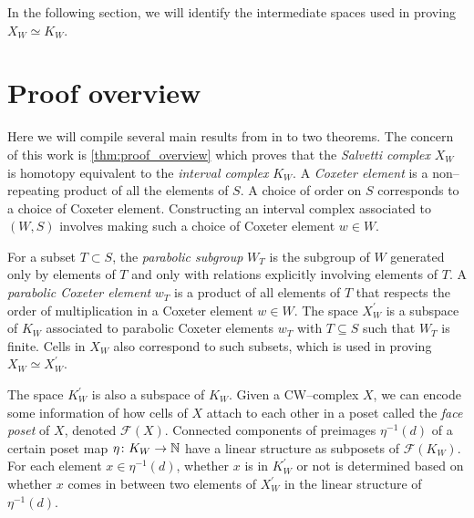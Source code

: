 \documentclass[class=guthesis, crop=false]{standalone}
\begin{document}
In the following section, we will identify the intermediate spaces used in proving $X_W \simeq K_W$.

\section{Proof overview}

Here we will compile several main results from \cite{paolini_salvetti_kpi1_2021} in to two theorems. The concern of this work is \cref{thm:proof_overview} which proves that the \emph{Salvetti complex} $X_W$ is homotopy equivalent to the \emph{interval complex} $K_W$. A \emph{Coxeter element} is a non--repeating product of all the elements of $S$. A choice of order on $S$ corresponds to a choice of Coxeter element. Constructing an interval complex associated to $(W,S)$ involves making such a choice of Coxeter element $w \in W$. 

For a subset $T \subset S$, the \emph{parabolic subgroup} $W_T$ is the subgroup of $W$ generated only by elements of $T$ and only with relations explicitly involving elements of $T$. A \emph{parabolic Coxeter element} $w_T$ is a product of all elements of $T$ that respects the order of multiplication in a Coxeter element $w \in W$. The space $X_W^\prime$ is a subspace of $K_W$ associated to parabolic Coxeter elements $w_T$ with $T \subseteq S$ such that $W_T$ is finite. Cells in $X_W$ also correspond to such subsets, which is used in proving $X_W \simeq X_W^\prime$.

The space $K_W^\prime$ is also a subspace of $K_W$. Given a CW--complex $X$, we can encode some information of how cells of $X$ attach to each other in a poset called the \emph{face poset} of $X$, denoted $\mathcal{F}(X)$. Connected components of preimages $\eta^{-1}(d)$ of a certain poset map $\eta \colon K_W \to \mathbb{N}$ have a linear structure as subposets of $\mathcal{F}(K_W)$. For each element $x \in \eta^{-1}(d)$, whether $x$ is in $K_W^\prime$ or not is determined based on whether $x$ comes in between two elements of $X_W^\prime$ in the linear structure of $\eta^{-1}(d)$.
\end{document}
